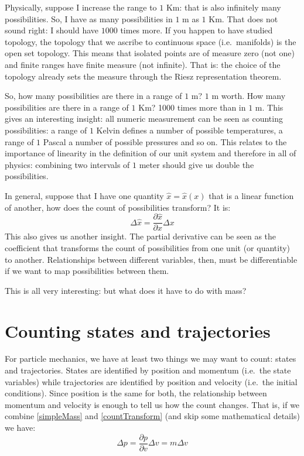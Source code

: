 \documentclass[aps,pra,10pt,floatfix,nofootinbib]{revtex4-1}
\theoremstyle{definition}
\begin{document}
Physically, suppose I increase the range to $1$ Km: that is also infinitely many possibilities. So, I have as many possibilities in $1$ m as $1$ Km. That does not sound right: I should have $1000$ times more. If you happen to have studied topology, the topology that we ascribe to continuous space (i.e.~manifolds) is the open set topology. This means that isolated points are of measure zero (not one) and finite ranges have finite measure (not infinite). That is: the choice of the topology already sets the measure through the Riesz representation theorem.

So, how many possibilities are there in a range of $1$ m? $1$ m worth. How many possibilities are there in a range of $1$ Km? 1000 times more than in $1$ m. This gives an interesting insight: all numeric measurement can be seen as counting possibilities: a range of $1$ Kelvin defines a number of possible temperatures, a range of $1$ Pascal a number of possible pressures and so on. This relates to the importance of linearity in the definition of our unit system and therefore in all of physics: combining two intervals of $1$ meter should give us double the possibilities.

In general, suppose that I have one quantity $\hat{x}=\hat{x}(x)$ that is a linear function of another, how does the count of possibilities transform? It is:
\begin{equation}
\label{countTransform}
\Delta \hat{x} = \frac{\partial \hat{x}}{\partial x} \Delta x
\end{equation}
This also gives us another insight. The partial derivative can be seen as the coefficient that transforms the count of possibilities from one unit (or quantity) to another. Relationships between different variables, then, must be differentiable if we want to map possibilities between them.

This is all very interesting: but what does it have to do with mass?

\section{Counting states and trajectories}

For particle mechanics, we have at least two things we may want to count: states and trajectories. States are identified by position and momentum (i.e.~the state variables) while trajectories are identified by position and velocity (i.e.~the initial conditions). Since position is the same for both, the relationship between momentum and velocity is enough to tell us how the count changes. That is, if we combine \eqref{simpleMass} and \eqref{countTransform} (and skip some mathematical details) we have:
\begin{equation}
\label{stateCountTransform}
\Delta p = \frac{\partial p}{\partial v} \Delta v = m \Delta v
\end{equation}
\end{document}
